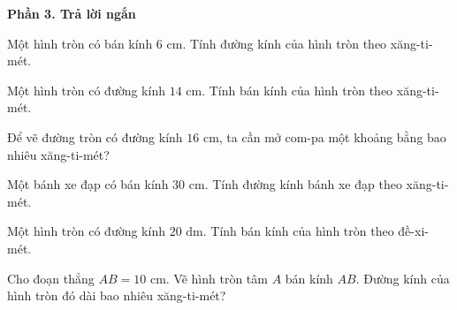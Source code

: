 \textbf{Phần 3. Trả lời ngắn}

\begin{ex} %
Một hình tròn có bán kính $6\text{ cm}$. Tính đường kính của hình tròn theo xăng-ti-mét.
\end{ex}

\begin{ex} %
Một hình tròn có đường kính $14\text{ cm}$. Tính bán kính của hình tròn theo xăng-ti-mét.
\end{ex}

\begin{ex} %
Để vẽ đường tròn có đường kính $16\text{ cm}$, ta cần mở com-pa một khoảng bằng bao nhiêu xăng-ti-mét?
\end{ex}

\begin{ex} %
Một bánh xe đạp có bán kính $30\text{ cm}$. Tính đường kính bánh xe đạp theo xăng-ti-mét.
\end{ex}

\begin{ex} %
Một hình tròn có đường kính $20\text{ dm}$. Tính bán kính của hình tròn theo đề-xi-mét.
\end{ex}

\begin{ex} %
Cho đoạn thẳng $AB = 10\text{ cm}$. Vẽ hình tròn tâm $A$ bán kính $AB$. Đường kính của hình tròn đó dài bao nhiêu xăng-ti-mét?
\end{ex}
